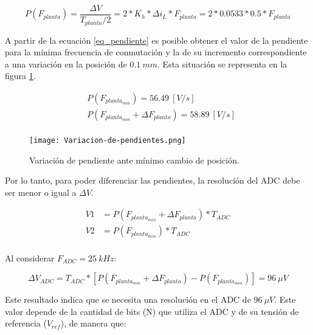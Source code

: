 \begin{equation} \label{eq_pendiente}
	P(F_{planta}) = \frac{\Delta V}{T_{planta}/2} = 2*K_h*\Delta i_L*F_{planta} = 2 * 0.0533 * 0.5 * F_{planta}
\end{equation}

 A partir de la ecuación \ref{eq_pendiente} es posible obtener el valor de la pendiente para la mínima frecuencia de conmutación y la de su incremento correspondiente a una variación en la posición de $0.1\:mm$. Esta situación se representa en la figura \ref{fig:variacion-de-pendiente}.

\begin{equation} 
	\begin{aligned}
		&P(F_{planta_{min}}) = 56.49\:[V/s] \\
		&P(F_{planta_{min}} + \Delta F_{planta}) = 58.89\:[V/s] \\
	\end{aligned}
\end{equation}

\begin{figure}[H]
	\centering
	\texttt{[image: Variacion-de-pendientes.png]}
	\caption{Variación de pendiente ante mínimo cambio de posición.}
	\label{fig:variacion-de-pendiente}
\end{figure}

Por lo tanto, para poder diferenciar las pendientes, la resolución del ADC debe ser menor o igual a $\Delta V$.

\begin{equation} 
	\begin{aligned}
		V1 &= P(F_{planta_{min}} + \Delta F_{planta})* T_{ADC} \\
		V2 &= P(F_{planta_{min}})* T_{ADC} \\		 
	\end{aligned}
\end{equation}

Al considerar $F_{ADC} = 25\:kHz$:

\begin{equation} 
	\Delta V_{ADC} = T_{ADC} * [P(F_{planta_{min}} + \Delta F_{planta}) - P(F_{planta_{min}})] = 96\:\mu V
\end{equation}



 Este resultado indica que se necesita una resolución en el ADC de $96\:\mu V$. Este valor depende de la cantidad de bits (N) que utiliza el ADC y de su tensión de referencia ($V_{ref}$), de manera que:
 

